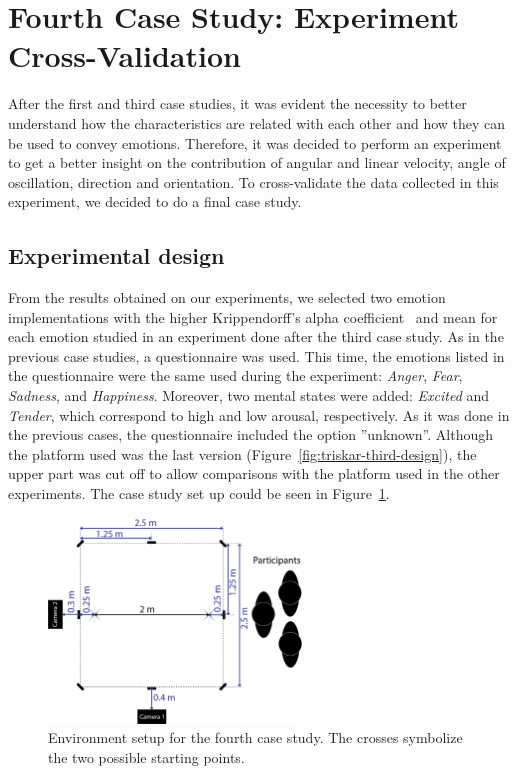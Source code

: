 \section{Fourth Case Study: Experiment Cross-Validation}

After the first and third case studies, it was evident the necessity to better understand how the characteristics are related with each other and how they can be used to convey emotions. Therefore, it was decided to perform an experiment~\cite{Angel2017} to get a better insight on the contribution of angular and linear velocity, angle of oscillation, direction and orientation. To cross-validate the data collected in this experiment, we decided to do a final case study.

\subsection{Experimental design}

From the results obtained on our experiments, we selected two emotion implementations with the higher Krippendorff's alpha coefficient~\cite{Klaus2007} and mean for each emotion studied in an experiment done after the third case study. As in the previous case studies, a questionnaire was used. This time, the emotions listed in the questionnaire were the same used during the experiment: \textit{Anger}, \textit{Fear}, \textit{Sadness}, and \textit{Happiness}. Moreover, two mental states were added: \textit{Excited} and \textit{Tender}, which correspond to high and low arousal, respectively. As it was done in the previous cases, the questionnaire included the option ''unknown''. Although the platform used was the last version (Figure~\ref{fig:triskar-third-design}), the upper part was cut off to allow comparisons with the platform used in the other experiments. The case study set up could be seen in Figure~\ref{fig:setup_fourth}.

\begin{figure}[h]
	\centering
	\includegraphics[width=0.60\textwidth]{./Images/FourthCase.png} 
	\caption{Environment setup for the fourth case study. The crosses symbolize the two possible starting points.}
	\label{fig:setup_fourth}
\end{figure}
 
